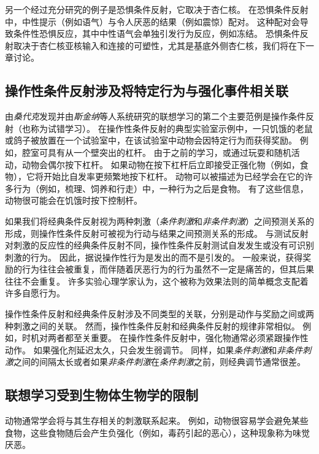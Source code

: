 另一个经过充分研究的例子是恐惧条件反射，它取决于杏仁核。
在恐惧条件反射中，中性提示（例如语气）与令人厌恶的结果（例如震惊）配对。
这种配对会导致条件性恐惧反应，其中中性语气会单独引发行为反应，例如冻结。
恐惧条件反射取决于杏仁核亚核输入和连接的可塑性，尤其是基底外侧杏仁核，我们将在下一章讨论。



\subsection{操作性条件反射涉及将特定行为与强化事件相关联}

由\textit{桑代克}发现并由\textit{斯金纳}等人系统研究的联想学习的第二个主要范例是操作条件反射（也称为试错学习）。
在操作性条件反射的典型实验室示例中，一只饥饿的老鼠或鸽子被放置在一个试验室中，在该试验室中动物会因特定行为而获得奖励。
例如，腔室可具有从一个壁突出的杠杆。 由于之前的学习，或通过玩耍和随机活动，动物会偶尔按下杠杆。
如果动物在按下杠杆后立即接受正强化物（例如，食物），它将开始比自发率更频繁地按下杠杆。
动物可以被描述为已经学会在它的许多行为（例如，梳理、饲养和行走）中，一种行为之后是食物。
有了这些信息，动物很可能会在饥饿时按下控制杆。


如果我们将经典条件反射视为两种刺激（\textit{条件刺激}和\textit{非条件刺激}）之间预测关系的形成，则操作性条件反射可被视为行动与结果之间预测关系的形成。
与测试反射对刺激的反应性的经典条件反射不同，操作性条件反射测试自发发生或没有可识别刺激的行为。
因此，据说操作性行为是发出的而不是引发的。
一般来说，获得奖励的行为往往会被重复，而伴随着厌恶行为的行为虽然不一定是痛苦的，但其后果往往不会重复。
许多实验心理学家认为，这个被称为效果法则的简单概念支配着许多自愿行为。


操作性条件反射和经典条件反射涉及不同类型的关联，分别是动作与奖励之间或两种刺激之间的关联。
然而，操作性条件反射和经典条件反射的规律非常相似。
例如，时机对两者都至关重要。
在操作性条件反射中，强化物通常必须紧跟操作性动作。
如果强化剂延迟太久，只会发生弱调节。
同样，如果\textit{条件刺激}和\textit{非条件刺激}之间的间隔太长或者如果\textit{非条件刺激}在\textit{条件刺激}之前，则经典调节通常很差。



\subsection{联想学习受到生物体生物学的限制}

动物通常学会将与其生存相关的刺激联系起来。
例如，动物很容易学会避免某些食物，这些食物随后会产生负强化（例如，毒药引起的恶心），这种现象称为味觉厌恶。


